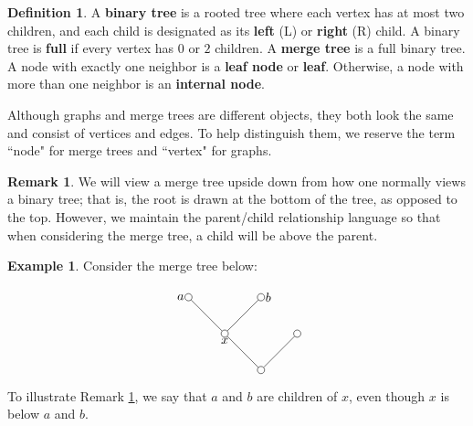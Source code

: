 \documentclass{article}
\theoremstyle{definition}
\newtheorem{rem}[thm]   {Remark}
\newtheorem{defn}[thm]  {Definition}
\newtheorem{ex}[thm]    {Example}
\begin{document}
\begin{defn}\label{defn merge tree} A \textbf{binary tree} is a rooted tree where each vertex has at most two children, and each child is designated as its \textbf{left} (L) or \textbf{right} (R) child.  A binary tree is \textbf{full} if every vertex has $0$ or $2$ children. A \textbf{merge tree} is a full binary tree. A node with exactly one neighbor is a \textbf{leaf node} or \textbf{leaf}. Otherwise, a node with more than one neighbor is an \textbf{internal node}.
\end{defn}



Although graphs and merge trees are different objects, they both look the same and consist of vertices and edges.  To help distinguish them, we reserve the term ``node" for merge trees and ``vertex" for graphs.

\begin{rem}\label{rem: parent/child} We will view a merge tree upside down from how one normally views a binary tree; that is, the root is drawn at the bottom of the tree, as opposed to the top. However, we maintain the parent/child relationship language so that when considering the merge tree, a child will be above the parent.
\end{rem}

\begin{ex}
Consider the merge tree below:


$$
\begin{tikzpicture}


\node[inner sep=2pt, circle] (0) at (0,2) [draw] {};
\node[inner sep=2pt, circle] (1) at (2,2) [draw] {};
\node[inner sep=2pt, circle] (2) at (3,1) [draw] {};
\node[inner sep=2pt, circle] (3) at (1,1) [draw] {};
\node[inner sep=2pt, circle] (4) at (2,0) [draw] {};

\draw[-]  (0)--(3) node[midway, below] {};
\draw[-]  (3)--(1) node[midway, below] {};
\draw[-]  (3)--(4) node[midway, below] {};
\draw[-]  (2)--(4) node[midway, below] {};

\node[anchor = east]  at (0) {{$a$}};
\node[anchor = west]  at (1) {{$b$}};
\node[anchor = north]  at (3) {{$x$}};



\end{tikzpicture}
$$


To illustrate Remark \ref{rem: parent/child}, we say that $a$ and $b$ are children of $x$, even though $x$ is below $a$ and $b$.
\end{ex}
\end{document}
